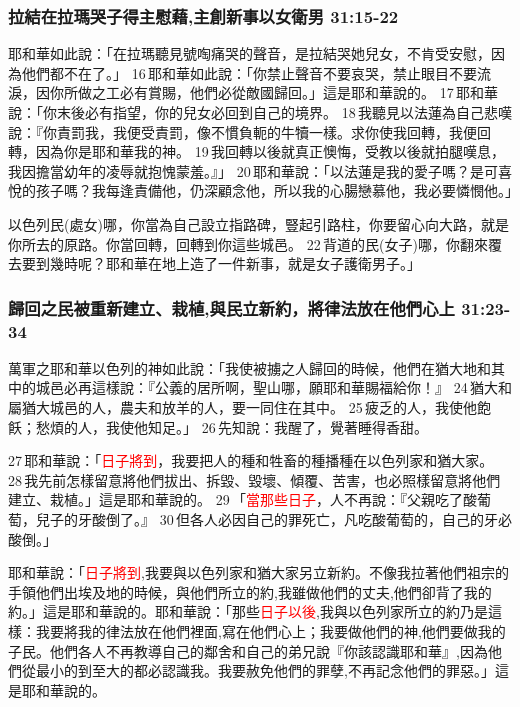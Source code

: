 \subsubsection{拉結在拉瑪哭子得主慰藉,主創新事以女衛男 31:15-22}
耶和華如此說：「在拉瑪聽見號啕痛哭的聲音，是拉結哭她兒女，不肯受安慰，因為他們都不在了。」 16 耶和華如此說：「你禁止聲音不要哀哭，禁止眼目不要流淚，因你所做之工必有賞賜，他們必從敵國歸回。」這是耶和華說的。 17 耶和華說：「你末後必有指望，你的兒女必回到自己的境界。 18 我聽見以法蓮為自己悲嘆說：『你責罰我，我便受責罰，像不慣負軛的牛犢一樣。求你使我回轉，我便回轉，因為你是耶和華我的神。 19 我回轉以後就真正懊悔，受教以後就拍腿嘆息，我因擔當幼年的凌辱就抱愧蒙羞。』」 20 耶和華說：「以法蓮是我的愛子嗎？是可喜悅的孩子嗎？我每逢責備他，仍深顧念他，所以我的心腸戀慕他，我必要憐憫他。」

以色列民(處女)哪，你當為自己設立指路碑，豎起引路柱，你要留心向大路，就是你所去的原路。你當回轉，回轉到你這些城邑。 22 背道的民(女子)哪，你翻來覆去要到幾時呢？耶和華在地上造了一件新事，就是女子護衛男子。」

\subsubsection{歸回之民被重新建立、栽植,與民立新約，將律法放在他們心上 31:23-34}
萬軍之耶和華以色列的神如此說：「我使被擄之人歸回的時候，他們在猶大地和其中的城邑必再這樣說：『公義的居所啊，聖山哪，願耶和華賜福給你！』 24 猶大和屬猶大城邑的人，農夫和放羊的人，要一同住在其中。 25 疲乏的人，我使他飽飫；愁煩的人，我使他知足。」 26 先知說：我醒了，覺著睡得香甜。

27 耶和華說：「\textcolor{red}{日子將到}，我要把人的種和牲畜的種播種在以色列家和猶大家。 28 我先前怎樣留意將他們拔出、拆毀、毀壞、傾覆、苦害，也必照樣留意將他們建立、栽植。」這是耶和華說的。 29 「\textcolor{red}{當那些日子}，人不再說：『父親吃了酸葡萄，兒子的牙酸倒了。』 30 但各人必因自己的罪死亡，凡吃酸葡萄的，自己的牙必酸倒。」

耶和華說：「\textcolor{red}{日子將到},我要與以色列家和猶大家另立新約。不像我拉著他們祖宗的手領他們出埃及地的時候，與他們所立的約,我雖做他們的丈夫,他們卻背了我的約。」這是耶和華說的。耶和華說：「那些\textcolor{red}{日子以後},我與以色列家所立的約乃是這樣：我要將我的律法放在他們裡面,寫在他們心上；我要做他們的神,他們要做我的子民。他們各人不再教導自己的鄰舍和自己的弟兄說『你該認識耶和華』,因為他們從最小的到至大的都必認識我。我要赦免他們的罪孽,不再記念他們的罪惡。」這是耶和華說的。

